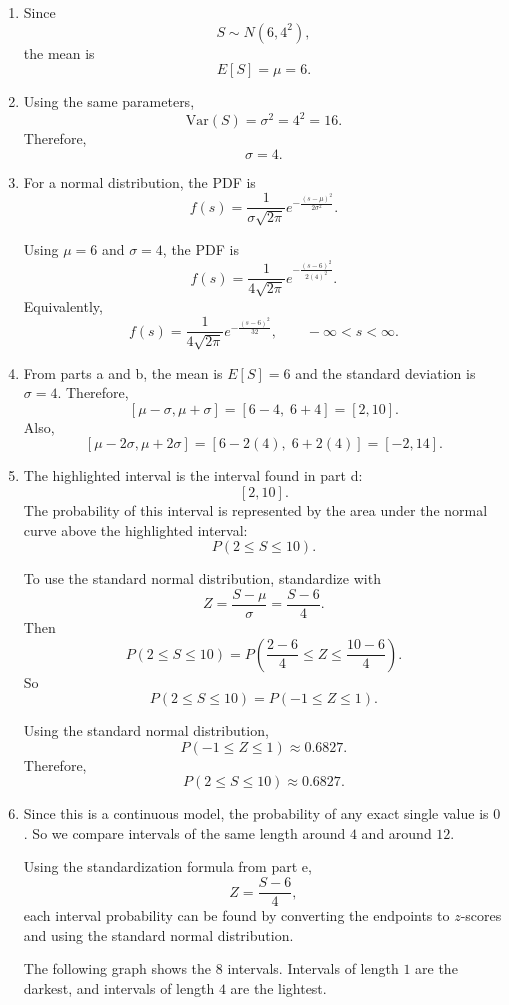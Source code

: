 \begin{enumerate}[label=\textbf{\alph*)}]
	\item Since
	\[
	S\sim N(6,4^2),
	\]
	the mean is
	\[
	E[S]=\mu=6.
	\]
	
	\item Using the same parameters,
	\[
	\mathrm{Var}(S)=\sigma^2=4^2=16.
	\]
	Therefore,
	\[
	\sigma=4.
	\]
	
	\item For a normal distribution, the PDF is
	\[
	f(s)=\frac{1}{\sigma\sqrt{2\pi}}e^{-\frac{(s-\mu)^2}{2\sigma^2}}.
	\]
	
	Using \(\mu=6\) and \(\sigma=4\), the PDF is
	\[
	f(s)=\frac{1}{4\sqrt{2\pi}}e^{-\frac{(s-6)^2}{2(4)^2}}.
	\]
	Equivalently,
	\[
	f(s)=\frac{1}{4\sqrt{2\pi}}e^{-\frac{(s-6)^2}{32}},
	\qquad -\infty<s<\infty.
	\]
	
	\item From parts a and b, the mean is \(E[S]=6\) and the standard deviation is \(\sigma=4\). Therefore,
	\[
	[\mu-\sigma,\mu+\sigma]
	=
	[6-4,\;6+4]
	=
	[2,10].
	\]
	Also,
	\[
	[\mu-2\sigma,\mu+2\sigma]
	=
	[6-2(4),\;6+2(4)]
	=
	[-2,14].
	\]
	
	
	\item The highlighted interval is the interval found in part d:
	\[
	[2,10].
	\]
	The probability of this interval is represented by the area under the normal curve above the highlighted interval:
	\[
	P(2\le S\le 10).
	\]
	
	To use the standard normal distribution, standardize with
	\[
	Z=\frac{S-\mu}{\sigma}
	=
	\frac{S-6}{4}.
	\]
	Then
	\[
	P(2\le S\le 10)
	=
	P\left(\frac{2-6}{4}\le Z\le \frac{10-6}{4}\right).
	\]
	So
	\[
	P(2\le S\le 10)
	=
	P(-1\le Z\le 1).
	\]
	
	Using the standard normal distribution,
	\[
	P(-1\le Z\le 1)\approx 0.6827.
	\]
	Therefore,
	\[
	P(2\le S\le 10)\approx 0.6827.
	\]
	
		\item Since this is a continuous model, the probability of any exact single value is \(0\). So we compare intervals of the same length around \(4\) and around \(12\).
	
	Using the standardization formula from part e,
	\[
	Z=\frac{S-6}{4},
	\]
	each interval probability can be found by converting the endpoints to \(z\)-scores and using the standard normal distribution.
	
	The following graph shows the \(8\) intervals. Intervals of length \(1\) are the darkest, and intervals of length \(4\) are the lightest.
	

\end{enumerate}
